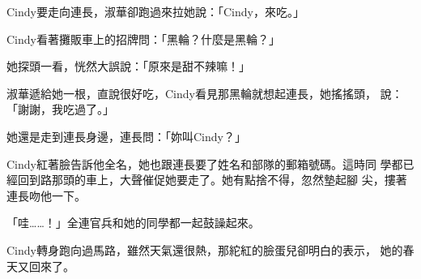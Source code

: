 Cindy要走向連長，淑華卻跑過來拉她說：「Cindy，來吃。」

Cindy看著攤販車上的招牌問：「黑輪？什麼是黑輪？」

她探頭一看，恍然大誤說：「原來是甜不辣嘛！」

淑華遞給她一根，直說很好吃，Cindy看見那黑輪就想起連長，她搖搖頭，
說：「謝謝，我吃過了。」

她還是走到連長身邊，連長問：「妳叫Cindy？」

Cindy紅著臉告訴他全名，她也跟連長要了姓名和部隊的郵箱號碼。這時同
學都已經回到路那頭的車上，大聲催促她要走了。她有點捨不得，忽然墊起腳
尖，摟著連長吻他一下。

「哇……！」全連官兵和她的同學都一起鼓譟起來。

Cindy轉身跑向過馬路，雖然天氣還很熱，那紽紅的臉蛋兒卻明白的表示，
她的春天又回來了。











